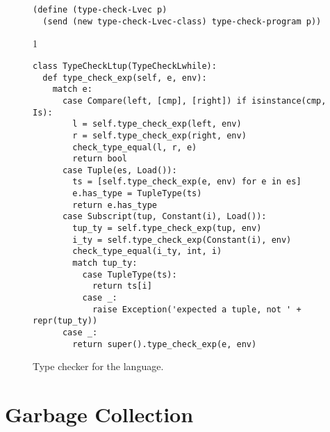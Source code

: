 \documentclass[7x10]{TimesAPriori_MIT}%
\def\pythonEd{1}
\def\edition{1}
\newcommand{\pythonColor}[0]{}
\numberwithin{theorem}{chapter}
\numberwithin{definition}{chapter}
\numberwithin{equation}{chapter}
\begin{document}
\begin{figure}[tp]
\begin{tcolorbox}[colback=white]
{\begin{lstlisting}[basicstyle=\ttfamily\footnotesize]
(define (type-check-Lvec p)
  (send (new type-check-Lvec-class) type-check-program p))
\end{lstlisting}
\fi}
{\if\edition\pythonEd\pythonColor
\begin{lstlisting}
class TypeCheckLtup(TypeCheckLwhile):
  def type_check_exp(self, e, env):
    match e:
      case Compare(left, [cmp], [right]) if isinstance(cmp, Is):
        l = self.type_check_exp(left, env)
        r = self.type_check_exp(right, env)
        check_type_equal(l, r, e)
        return bool
      case Tuple(es, Load()):
        ts = [self.type_check_exp(e, env) for e in es]
        e.has_type = TupleType(ts)
        return e.has_type
      case Subscript(tup, Constant(i), Load()):
        tup_ty = self.type_check_exp(tup, env)
        i_ty = self.type_check_exp(Constant(i), env)
        check_type_equal(i_ty, int, i)
        match tup_ty:
          case TupleType(ts):
            return ts[i]
          case _:
            raise Exception('expected a tuple, not ' + repr(tup_ty))
      case _:
        return super().type_check_exp(e, env)
\end{lstlisting}
\fi}
  \end{tcolorbox}

  \caption{Type checker for the \LangVec{} language.}
\label{fig:type-check-Lvec}
\end{figure}


\section{Garbage Collection}
\label{sec:GC}
\end{document}
